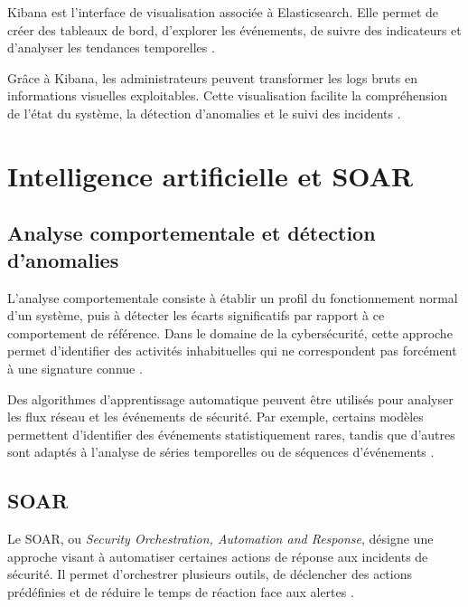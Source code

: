 \documentclass[12pt,a4paper,oneside]{report}
\begin{document}
	Kibana est l'interface de visualisation associée à Elasticsearch. Elle permet de créer des tableaux de bord, d'explorer les événements, de suivre des indicateurs et d'analyser les tendances temporelles \cite{elastic_stack_docs}.
	
	Grâce à Kibana, les administrateurs peuvent transformer les logs bruts en informations visuelles exploitables. Cette visualisation facilite la compréhension de l'état du système, la détection d'anomalies et le suivi des incidents \cite{elastic_stack_docs}.
	
	\section{Intelligence artificielle et SOAR}
	
	\subsection{Analyse comportementale et détection d'anomalies}
	
	L'analyse comportementale consiste à établir un profil du fonctionnement normal d'un système, puis à détecter les écarts significatifs par rapport à ce comportement de référence. Dans le domaine de la cybersécurité, cette approche permet d'identifier des activités inhabituelles qui ne correspondent pas forcément à une signature connue \cite{zeek_docs,elastic_stack_docs}.
	
	Des algorithmes d'apprentissage automatique peuvent être utilisés pour analyser les flux réseau et les événements de sécurité. Par exemple, certains modèles permettent d'identifier des événements statistiquement rares, tandis que d'autres sont adaptés à l'analyse de séries temporelles ou de séquences d'événements \cite{kreutz_sdn_survey}.
	
	\subsection{SOAR}
	
	Le SOAR, ou \textit{Security Orchestration, Automation and Response}, désigne une approche visant à automatiser certaines actions de réponse aux incidents de sécurité. Il permet d'orchestrer plusieurs outils, de déclencher des actions prédéfinies et de réduire le temps de réaction face aux alertes \cite{elastic_stack_docs}.
	
\end{document}
